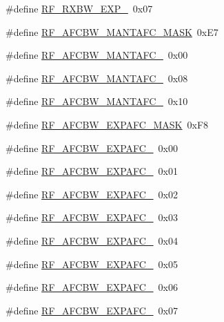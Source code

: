 \begin{DoxyCompactItemize}
\item 
\#define \mbox{\hyperlink{sx1276_regs-_fsk_8h_a600d1cc75c5d6b87ea49e5fdf8d05de2}{R\+F\+\_\+\+R\+X\+B\+W\+\_\+\+E\+X\+P\+\_}}~0x07
\item 
\#define \mbox{\hyperlink{sx1276_regs-_fsk_8h_a7d35ac3bf14ffc3be17ac5450bc781a7}{R\+F\+\_\+\+A\+F\+C\+B\+W\+\_\+\+M\+A\+N\+T\+A\+F\+C\+\_\+\+M\+A\+SK}}~0x\+E7
\item 
\#define \mbox{\hyperlink{sx1276_regs-_fsk_8h_abf43472df1a0e71a5381ab56f212366b}{R\+F\+\_\+\+A\+F\+C\+B\+W\+\_\+\+M\+A\+N\+T\+A\+F\+C\+\_}}~0x00
\item 
\#define \mbox{\hyperlink{sx1276_regs-_fsk_8h_aac631ae8fd6d24284d6624ef2c32f0ec}{R\+F\+\_\+\+A\+F\+C\+B\+W\+\_\+\+M\+A\+N\+T\+A\+F\+C\+\_}}~0x08
\item 
\#define \mbox{\hyperlink{sx1276_regs-_fsk_8h_a0fa0fc9612a4b48114ed43fb4e2e95b4}{R\+F\+\_\+\+A\+F\+C\+B\+W\+\_\+\+M\+A\+N\+T\+A\+F\+C\+\_}}~0x10
\item 
\#define \mbox{\hyperlink{sx1276_regs-_fsk_8h_a73aab542bba68b65d6e6e529a6e502c1}{R\+F\+\_\+\+A\+F\+C\+B\+W\+\_\+\+E\+X\+P\+A\+F\+C\+\_\+\+M\+A\+SK}}~0x\+F8
\item 
\#define \mbox{\hyperlink{sx1276_regs-_fsk_8h_a8cc2a4a34787108b59e150f19a27c9a6}{R\+F\+\_\+\+A\+F\+C\+B\+W\+\_\+\+E\+X\+P\+A\+F\+C\+\_}}~0x00
\item 
\#define \mbox{\hyperlink{sx1276_regs-_fsk_8h_afe3cf2aebd859024337d286c1ab68f6a}{R\+F\+\_\+\+A\+F\+C\+B\+W\+\_\+\+E\+X\+P\+A\+F\+C\+\_}}~0x01
\item 
\#define \mbox{\hyperlink{sx1276_regs-_fsk_8h_a7b89d616e4ba9c65441deb101651f638}{R\+F\+\_\+\+A\+F\+C\+B\+W\+\_\+\+E\+X\+P\+A\+F\+C\+\_}}~0x02
\item 
\#define \mbox{\hyperlink{sx1276_regs-_fsk_8h_a93a930a33871216aaa3bc41a8bf2507b}{R\+F\+\_\+\+A\+F\+C\+B\+W\+\_\+\+E\+X\+P\+A\+F\+C\+\_}}~0x03
\item 
\#define \mbox{\hyperlink{sx1276_regs-_fsk_8h_a468c40d81d8271fa92a4331f4c3a6c74}{R\+F\+\_\+\+A\+F\+C\+B\+W\+\_\+\+E\+X\+P\+A\+F\+C\+\_}}~0x04
\item 
\#define \mbox{\hyperlink{sx1276_regs-_fsk_8h_a507cb037026ab04e1a1634a2ef8fa90b}{R\+F\+\_\+\+A\+F\+C\+B\+W\+\_\+\+E\+X\+P\+A\+F\+C\+\_}}~0x05
\item 
\#define \mbox{\hyperlink{sx1276_regs-_fsk_8h_a1ebab24d4f23c9430b1b65b670bf2b79}{R\+F\+\_\+\+A\+F\+C\+B\+W\+\_\+\+E\+X\+P\+A\+F\+C\+\_}}~0x06
\item 
\#define \mbox{\hyperlink{sx1276_regs-_fsk_8h_a99b0f60379ae9cf93b92a8108977cf1d}{R\+F\+\_\+\+A\+F\+C\+B\+W\+\_\+\+E\+X\+P\+A\+F\+C\+\_}}~0x07

\end{DoxyCompactItemize}
